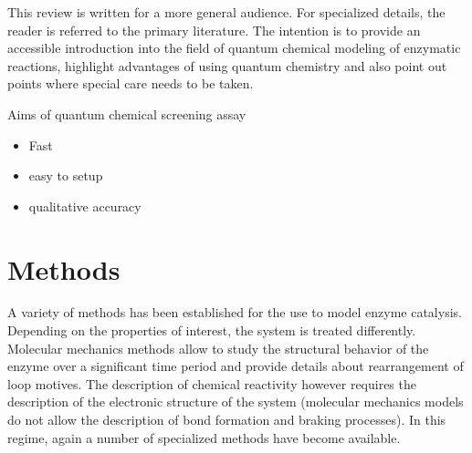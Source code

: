 This review is written for a more general audience.
For specialized details, the reader is referred to the primary literature.
The intention is to provide an accessible introduction into the field of quantum chemical modeling of enzymatic reactions, highlight advantages of using quantum chemistry and also point out points where special care needs to be taken.

Aims of quantum chemical screening assay
\begin{itemize}
\item Fast
\item easy to setup
\item qualitative accuracy
\end{itemize}


\section{Methods}\label{sec:methods}
A variety of methods has been established for the use to model enzyme catalysis.
Depending on the properties of interest, the system is treated differently.
Molecular mechanics methods allow to study the structural behavior of the enzyme over a significant time period and provide details about rearrangement of loop motives.
The description of chemical reactivity however requires the description of the electronic structure of the system (molecular mechanics models do not allow the description of bond formation and braking processes).
In this regime, again a number of specialized methods have become available.

